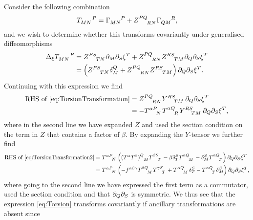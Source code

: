 Consider the following combination \cite{Cederwall:2013naa}
\begin{equation}\label{eq:Torsion}
    \tensor{T}{_{MN}^P} = \tensor{\Gamma}{_{MN}^P}+\tensor{Z}{^{PQ}_{RN}}\tensor{\Gamma}{_{QM}^R},
\end{equation}
and we wish to determine whether this transforms covariantly under generalised diffeomorphisms
\begin{equation}\label{eq:TorsionTransformation}
    \begin{aligned}
        \Delta_\xi\tensor{T}{_M_N^P} &= \tensor{Z}{^{PS}_{TN}}\pd_M\pd_S\xi^T+\tensor{Z}{^{PQ}_{RN}}\tensor{Z}{^{RS}_{TM}}\pd_Q\pd_S\xi^T\\
        &=\left(\tensor{Z}{^{PS}_{TN}}\delta_M^Q+\tensor{Z}{^{PQ}_{RN}}\tensor{Z}{^{RS}_{TM}}\right)\pd_Q\pd_S\xi^T.
    \end{aligned}
\end{equation}
Continuing with this expression we find 
\begin{equation}\label{eq:TorsionTransformation2}
    \begin{aligned}
    \text{RHS of } \eqref{eq:TorsionTransformation} &= \tensor{Z}{^{PQ}_{RN}}\tensor{Y}{^{RS}_{TM}}\pd_Q\pd_S\xi^T\\
    & =  -\tensor{T}{^\alpha^P_N}\tensor{T}{^{\alpha Q}_R}\tensor{Y}{^{RS}_{TM}}\pd_Q\pd_S\xi^T,
    \end{aligned}
\end{equation}
where in the second line we have expanded $Z$ and used the section condition on the term in $Z$ that contains a factor of $\beta$. By expanding the $Y$-tensor we further find 
\begin{equation}
    \begin{aligned}
        \text{RHS of } \eqref{eq:TorsionTransformation2} &= \tensor{T}{^{\alpha P}_N}\left((T^\alpha T^\beta)\tensor{}{^Q_M}\tensor{T}{^\beta ^S_T}-\beta\delta^S_T\tensor{T}{^{\alpha Q}_M}-\delta^S_M\tensor{T}{^{\alpha Q}_T}\right)\pd_Q\pd_S\xi^T\\
        &= \tensor{T}{^{\alpha P}_N}\left(-f^{\alpha\beta\gamma}\tensor{T}{^{\beta Q}_M}\tensor{T}{^{\gamma S}_T}+\tensor{T}{^{\alpha Q}_M}\delta^S_T-\tensor{T}{^{\alpha Q}_T}\delta^S_M\right)\pd_Q\pd_S\xi^T,\\
    \end{aligned}
\end{equation}
where going to the second line we have expressed the first term as a commutator, used the section condition and that $\partial_{Q}\partial_S$ is symmetric. We thus see that the expression \eqref{eq:Torsion} transforms covariantly if ancillary transformations are absent since
